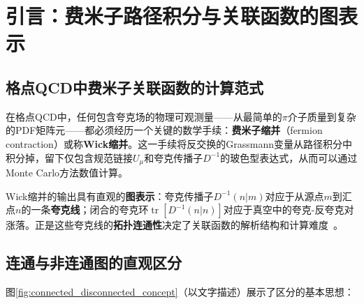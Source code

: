 \documentclass[12pt,a4paper]{ctexart}
\theoremstyle{definition}
\begin{document}
\begin{abstract}
\textbf{第五层——非连通图在现代格点部分子物理中的角色（§6）：}
以本库中的具体物理问题为例，展示非连通图的关键性和当前处理的挑战：(a) 奇异夸克PDF——$\bar s\Gamma s$算符的矩阵元纯由非连通图贡献，是全局拟合中约束最弱的味之一；(b) 胶子PDF中的非连通收缩——准胶子算符的部分收缩涉及胶子真空圈，信噪比极差；(c) $\pi$介子形状因子的非连通插入——在大动量转移因子化中，基于连通插入的假设（即忽略非连通贡献）需要独立的数值验证；(d) 质子自旋危机——味单态轴矢流矩阵元同时需要连通和非连通贡献，后者的计算是$\Delta\Sigma$和$\Delta G$格点确定的瓶颈。

本文以统一的数学语言（Wick定理、费米子传播子、Grassmann积分、行列式的hopping展开）将分散在教材各章和论文中的连通图/非连通图知识编织成一个有机整体，为理解格点QCD计算中的``图拓扑学''提供了系统性的理论手册。
\end{abstract}

\tableofcontents
\newpage

\section{引言：费米子路径积分与关联函数的图表示}

\subsection{格点QCD中费米子关联函数的计算范式}

在格点QCD中，任何包含夸克场的物理可观测量——从最简单的$\pi$介子质量到复杂的PDF矩阵元——都必须经历一个关键的数学手续：\textbf{费米子缩并}（fermion contraction）或称\textbf{Wick缩并}。这一手续将反交换的Grassmann变量从路径积分中积分掉，留下仅包含规范链接$U_\mu$和夸克传播子$D^{-1}$的玻色型表达式，从而可以通过Monte Carlo方法数值计算。

Wick缩并的输出具有直观的\textbf{图表示}：夸克传播子$D^{-1}(n|m)$对应于从源点$m$到汇点$n$的一条\textbf{夸克线}；闭合的夸克环$\operatorname{tr}[D^{-1}(n|n)]$对应于真空中的夸克-反夸克对涨落。正是这些夸克线的\textbf{拓扑连通性}决定了关联函数的解析结构和计算难度~\cite{GattringerLang2010}。

\subsection{连通与非连通图的直观区分}

图\ref{fig:connected_disconnected_concept}（以文字描述）展示了区分的基本思想：
\end{document}
